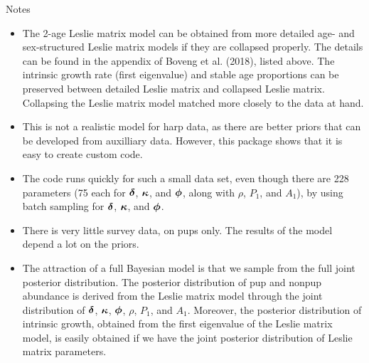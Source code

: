 \documentclass[mathserif,compress]{beamer}
\def\bdelta{\mbox{\boldmath $\delta$}}
\def\bphi{\mbox{\boldmath $\phi$}}
\def\bkappa{\mbox{\boldmath $\kappa$}}
\begin{document}
\begin{frame}
Notes

\begin{itemize}

  \item The 2-age Leslie matrix model can be obtained from more detailed age- and sex-structured Leslie matrix models if they are collapsed properly.  The details can be found in the appendix of Boveng et al. (2018), listed above.  The intrinsic growth rate (first eigenvalue) and stable age proportions can be preserved between detailed Leslie matrix and collapsed Leslie matrix.  Collapsing the Leslie matrix model matched more closely to the data at hand.
  
  \item This is not a realistic model for harp data, as there are better priors that can be developed from auxilliary data.  However, this package shows that it is easy to create custom code.
     
\end{itemize}

\end{frame}


\begin{frame}

\begin{itemize}

  \item The code runs quickly for such a small data set, even though there are 228 parameters (75 each for $\bdelta$, $\bkappa$, and $\bphi$, along with $\rho$, $P_{1}$, and $A_{1}$), by using batch sampling for $\bdelta$, $\bkappa$, and $\bphi$.

  \item There is very little survey data, on pups only.  The results of the model depend a lot on the priors.

  \item The attraction of a full Bayesian model is that we sample from the full joint posterior distribution.  The posterior distribution of pup and nonpup abundance is derived from the Leslie matrix model through the joint distribution of $\bdelta$, $\bkappa$, $\bphi$, $\rho$, $P_{1}$, and $A_{1}$.  Moreover, the posterior distribution of intrinsic growth, obtained from the first eigenvalue of the Leslie matrix model, is easily obtained if we have the joint posterior distribution of Leslie matrix parameters.
 
\end{itemize}

\end{frame}
\end{document}
